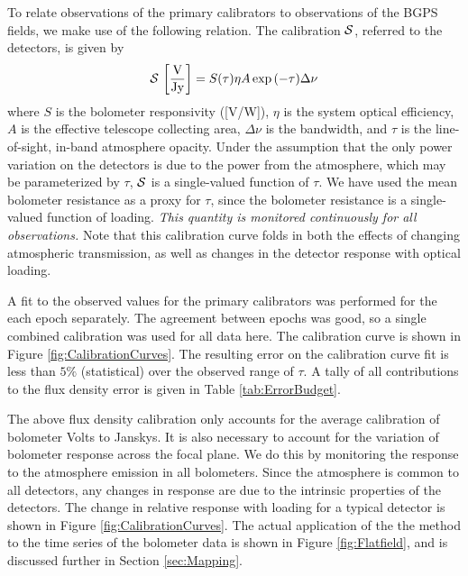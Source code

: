 \documentclass[12pt,preprint]{aastex}
\newcommand{\Check}{{\bf ???}}
\begin{document}
To relate observations of the primary calibrators to observations of
the BGPS fields, we make use of the following relation.  The
calibration ${\cal S}$, referred to the detectors, is given by
\begin{equation}
\label{eq:Calibration}
{\cal S} \, \left[\mathrm{\frac{V}{Jy}}\right] = 
S(\tau) \eta A \exp{(-\tau)} \Delta\nu
\end{equation}
where $S$ is the bolometer responsivity ([V/W]), $\eta$ is the system
optical efficiency, $A$ is the effective telescope collecting area,
$\Delta \nu$ is the bandwidth, and $\tau$ is the line-of-sight,
in-band atmosphere opacity.  Under the assumption that the only power
variation on the detectors is due to the power from the atmosphere,
which may be parameterized by $\tau$, ${\cal S}$ is a single-valued
function of $\tau$.  We have used the mean bolometer resistance as a
proxy for $\tau$, since the bolometer resistance is a single-valued
function of loading.  {\it This quantity is monitored continuously for
all observations.}  Note that this calibration curve folds in both the
effects of changing atmospheric transmission, as well as changes in
the detector response with optical loading.

%

A fit to the observed values for the primary calibrators was performed
for the each epoch separately.
The agreement between epochs was good, so a single combined
calibration was used for all data here.
The calibration curve is shown in Figure \ref{fig:CalibrationCurves}.  The
resulting error on the calibration curve fit is less than 
$5\%$ (statistical) over the observed range of $\tau$.  A tally of all
contributions to the flux density error is given in Table
\ref{tab:ErrorBudget}.

The above flux density calibration only accounts for the average
calibration of bolometer Volts to Janskys.  It is also necessary to
account for the variation of bolometer response across the focal
plane.  We do this by monitoring the response to the atmosphere
emission in all bolometers.  Since the atmosphere is common to all
detectors, any changes in response are due to the intrinsic properties
of the detectors.  The change in relative response with loading for a
typical detector is shown in Figure \ref{fig:CalibrationCurves}.  The
actual application of the the method to the time series of the
bolometer data is shown in Figure \ref{fig:Flatfield}, and is
discussed further in Section \ref{sec:Mapping}.
\end{document}
